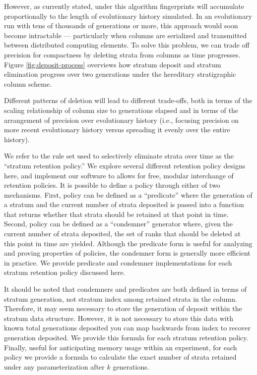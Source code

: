 

However, as currently stated, under this algorithm fingerprints will accumulate proportionally to the length of evolutionary history simulated.
In an evolutionary run with tens of thousands of generations or more, this approach would soon become intractable --- particularly when columns are serialized and transmitted between distributed computing elements.
To solve this problem, we can trade off precision for compactness by deleting strata from columns as time progresses.
Figure \ref{fig:deposit-process} overviews how stratum deposit and stratum elimination progress over two generations under the hereditary stratigraphic column scheme.

Different patterns of deletion will lead to different trade-offs, both in terms of the scaling relationship of column size to generations elapsed and in terms of the arrangement of precision over evolutionary history (i.e., focusing precision on more recent evolutionary history versus spreading it evenly over the entire history).

We refer to the rule set used to selectively eliminate strata over time as the ``stratum retention policy.''
We explore several different retention policy designs here, and implement our software to allows for free, modular interchange of retention policies.
It is possible to define a policy through either of two mechanisms.
First, policy can be defined as a ``predicate'' where the generation of a stratum and the current number of strata deposited is passed into a function that returns whether that strata should be retained at that point in time.
Second, policy can be defined as a ``condemner'' generator where, given the current number of strata deposited, the set of ranks that should be deleted at this point in time are yielded.
Although the predicate form is useful for analyzing and proving properties of policies, the condemner form is generally more efficient in practice.
We provide predicate and condemner implementations for each stratum retention policy discussed here.

It should be noted that condemners and predicates are both defined in terms of stratum generation, not stratum index among retained strata in the column.
Therefore, it may seem necessary to store the generation of deposit within the stratum data structure.
However, it is not necessary to store this data with known total generations deposited you can map backwards from index to recover generation deposited.
We provide this formula for each stratum retention policy.
Finally, useful for anticipating memory usage within an experiment, for each policy we provide a formula to calculate the exact number of strata retained under any parameterization after $k$ generations.

